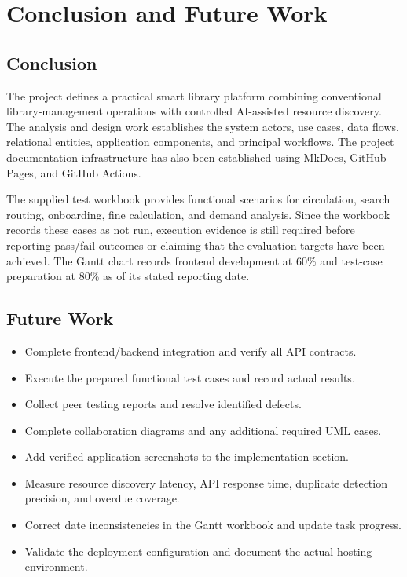 \documentclass[12pt,a4paper]{report}
\begin{document}
\chapter{Conclusion and Future Work}

\section{Conclusion}
The project defines a practical smart library platform combining conventional library-management operations with controlled AI-assisted resource discovery. The analysis and design work establishes the system actors, use cases, data flows, relational entities, application components, and principal workflows. The project documentation infrastructure has also been established using MkDocs, GitHub Pages, and GitHub Actions.

The supplied test workbook provides functional scenarios for circulation, search routing, onboarding, fine calculation, and demand analysis. Since the workbook records these cases as not run, execution evidence is still required before reporting pass/fail outcomes or claiming that the evaluation targets have been achieved. The Gantt chart records frontend development at 60\% and test-case preparation at 80\% as of its stated reporting date.

\section{Future Work}
\begin{itemize}
\item Complete frontend/backend integration and verify all API contracts.
\item Execute the prepared functional test cases and record actual results.
\item Collect peer testing reports and resolve identified defects.
\item Complete collaboration diagrams and any additional required UML cases.
\item Add verified application screenshots to the implementation section.
\item Measure resource discovery latency, API response time, duplicate detection precision, and overdue coverage.
\item Correct date inconsistencies in the Gantt workbook and update task progress.
\item Validate the deployment configuration and document the actual hosting environment.
\end{itemize}
\end{document}
